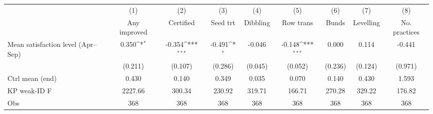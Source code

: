 {
\def\sym#1{\ifmmode^{#1}\else\(^{#1}\)\fi}
\begin{tabular}{l*{8}{c}}
\toprule
                    &\multicolumn{1}{c}{(1)}&\multicolumn{1}{c}{(2)}&\multicolumn{1}{c}{(3)}&\multicolumn{1}{c}{(4)}&\multicolumn{1}{c}{(5)}&\multicolumn{1}{c}{(6)}&\multicolumn{1}{c}{(7)}&\multicolumn{1}{c}{(8)}\\
                    &\multicolumn{1}{c}{Any improved}&\multicolumn{1}{c}{Certified}&\multicolumn{1}{c}{Seed trt}&\multicolumn{1}{c}{Dibbling}&\multicolumn{1}{c}{Row trans}&\multicolumn{1}{c}{Bunds}&\multicolumn{1}{c}{Levelling}&\multicolumn{1}{c}{No. practices}\\
\midrule
Mean satisfaction level (Apr--Sep)&       0.350\sym{*}  &      -0.354\sym{***}&      -0.491\sym{*}  &      -0.046         &      -0.148\sym{***}&       0.000         &       0.114         &      -0.441         \\
                    &     (0.211)         &     (0.107)         &     (0.286)         &     (0.045)         &     (0.052)         &     (0.236)         &     (0.124)         &     (0.971)         \\
\midrule
Ctrl mean (end)     &       0.430         &       0.140         &       0.349         &       0.035         &       0.070         &       0.140         &       0.430         &       1.593         \\
KP weak-ID F        &     2227.66         &      300.34         &      230.92         &      319.71         &      166.71         &      270.28         &      329.22         &      176.82         \\
Obs                 &         368         &         368         &         368         &         368         &         368         &         368         &         368         &         368         \\
\bottomrule
\end{tabular}
}

